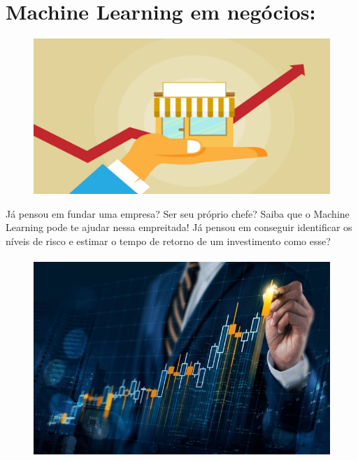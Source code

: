 \documentclass[12pt]{article}
\begin{document}
           \clearpage
           \section*{\centering Machine Learning em negócios:}\label{sec:ML_Negocios}
           \begin{figure}[ht]
           \centering
           \includegraphics[scale=0.5]{ldo-3.1.png}
           \end{figure}
   
           Já pensou em fundar uma empresa? Ser seu próprio chefe? Saiba que
o Machine Learning pode te ajudar nessa empreitada! Já pensou em
conseguir identificar os níveis de risco e estimar o tempo de retorno de
um investimento como esse?
            
            \paragraph{}
           \begin{figure}[ht]
           \centering
           \includegraphics[scale=0.5]{ldo-3.2.jpg}
           \end{figure}
           
\end{document}
